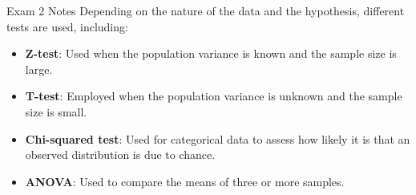 \begin{examnotes}{Exam 2 Notes}
    Depending on the nature of the data and the hypothesis, different tests are used, including:
    \begin{itemize}
        \item \textbf{Z-test}: Used when the population variance is known and the sample size is large.
        \item \textbf{T-test}: Employed when the population variance is unknown and the sample size is small.
        \item \textbf{Chi-squared test}: Used for categorical data to assess how likely it is that an observed distribution is due to chance.
        \item \textbf{ANOVA}: Used to compare the means of three or more samples.
    \end{itemize}    
\end{examnotes}